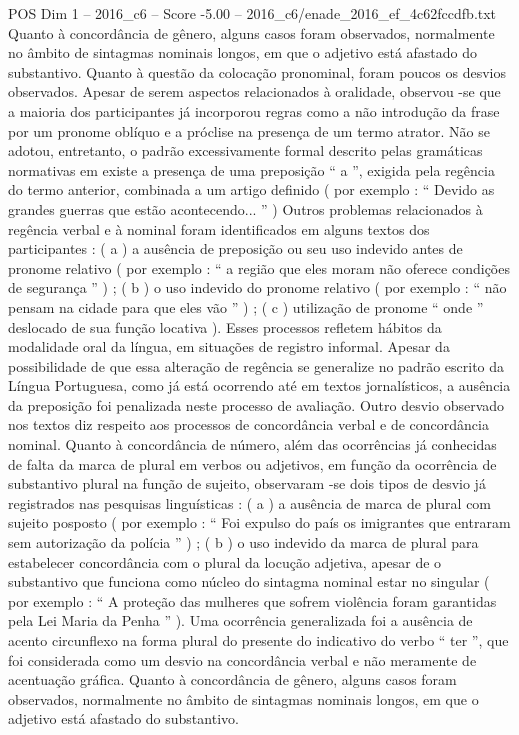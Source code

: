 \begin{textsample}{POS Dim 1 – 2016\_c6 – Score -5.00 – 2016\_c6/enade\_2016\_ef\_4c62fccdfb.txt}
Quanto à concordância de gênero, alguns casos foram observados, normalmente no âmbito de sintagmas nominais longos, em que o adjetivo está afastado do substantivo.
Quanto à questão da colocação pronominal, foram poucos os desvios observados.
Apesar de serem aspectos relacionados à oralidade, observou -se que a maioria dos participantes já incorporou regras como a não introdução da frase por um pronome oblíquo e a próclise na presença de um termo atrator.
Não se adotou, entretanto, o padrão excessivamente formal descrito pelas gramáticas normativas em existe a presença de uma preposição “ a ”, exigida pela regência do termo anterior, combinada a um artigo definido ( por exemplo : “ Devido as grandes guerras que estão acontecendo... ” ) Outros problemas relacionados à regência verbal e à nominal foram identificados em alguns textos dos participantes : ( a ) a ausência de preposição ou seu uso indevido antes de pronome relativo ( por exemplo : “ a região que eles moram não oferece condições de segurança ” ) ; ( b ) o uso indevido do pronome relativo ( por exemplo : “ não pensam na cidade para que eles vão ” ) ; ( c ) utilização de pronome “ onde ” deslocado de sua função locativa ).
Esses processos refletem hábitos da modalidade oral da língua, em situações de registro informal.
Apesar da possibilidade de que essa alteração de regência se generalize no padrão escrito da Língua Portuguesa, como já está ocorrendo até em textos jornalísticos, a ausência da preposição foi penalizada neste processo de avaliação.
Outro desvio observado nos textos diz respeito aos processos de concordância verbal e de concordância nominal.
Quanto à concordância de número, além das ocorrências já conhecidas de falta da marca de plural em verbos ou adjetivos, em função da ocorrência de substantivo plural na função de sujeito, observaram -se dois tipos de desvio já registrados nas pesquisas linguísticas : ( a ) a ausência de marca de plural com sujeito posposto ( por exemplo : “ Foi expulso do país os imigrantes que entraram sem autorização da polícia ” ) ; ( b ) o uso indevido da marca de plural para estabelecer concordância com o plural da locução adjetiva, apesar de o substantivo que funciona como núcleo do sintagma nominal estar no singular ( por exemplo : “ A proteção das mulheres que sofrem violência foram garantidas pela Lei Maria da Penha ” ).
Uma ocorrência generalizada foi a ausência de acento circunflexo na forma plural do presente do indicativo do verbo “ ter ”, que foi considerada como um desvio na concordância verbal e não meramente de acentuação gráfica.
Quanto à concordância de gênero, alguns casos foram observados, normalmente no âmbito de sintagmas nominais longos, em que o adjetivo está afastado do substantivo.

\end{textsample}
